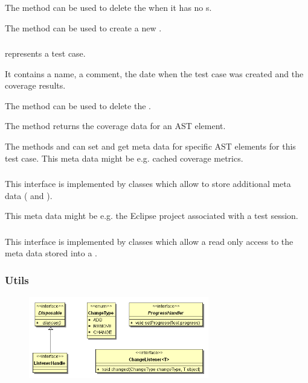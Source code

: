 The method  can be used to delete the  when
it has no s.

The method  can be used to create a new
.

\subsubsection{}

 represents a test case.

It contains a name, a comment, the date when the test case was created and
the coverage results.

The method  can be used to delete the .

The method  returns the coverage data for an
AST element.

The methods  and 
can set and get meta data for specific AST elements for this test case.
This meta data might be e.g. cached coverage metrics.

\subsubsection{}

This interface is implemented by classes which allow to store additional meta
data ( and ).

This meta data might be e.g. the Eclipse project associated with a test
session.

\subsubsection{}

This interface is implemented by classes which allow a read only access to the
meta data stored into a .

\subsubsection{Utils}

\begin{figure}[hbtp]
 \centering
 \includegraphics[width=0.7\textwidth]{images/Model/util.png}
 \caption{}
 \label{figure:Classes:Model:Utils}
\end{figure}

